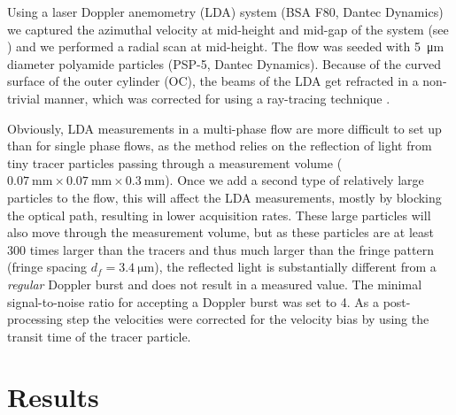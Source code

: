 Using a laser Doppler anemometry (LDA) system (BSA F80, Dantec Dynamics) we
captured the azimuthal velocity at mid-height and mid-gap of the system (see
) and we performed a radial scan at mid-height.
The flow was seeded with \SI{5}{\micro\metre} diameter polyamide particles
(PSP-5, Dantec Dynamics). Because of the curved surface of the outer cylinder
(OC), the beams of the LDA get refracted in a non-trivial manner, which was
corrected for using a ray-tracing technique \citep{Huisman2012}. 

Obviously, LDA measurements in a multi-phase flow are more difficult to set up
than for single phase flows, as the method relies on the reflection of
light from tiny tracer particles passing through a measurement volume
($\SI{0.07}{\milli\metre} \times \SI{0.07}{\milli\metre} \times
\SI{0.3}{\milli\metre}$).  Once we add a second type of relatively large
particles to the flow, this will affect the LDA measurements, mostly by
blocking the optical path, resulting in lower acquisition rates. These large
particles will also move through the measurement volume, but as these
particles are at least 300 times larger than the tracers and thus much larger
than the fringe pattern (fringe spacing $d_f=\SI{3.4}{\micro\metre}$), the
reflected light is substantially different from a \emph{regular} Doppler burst
and does not result in a measured value. The minimal signal-to-noise ratio for
accepting a Doppler burst was set to 4. As a post-processing step the
velocities were corrected for the velocity bias by using the transit time of
the tracer particle.
\newpage
\section{Results}\label{sec:sphereresults}
